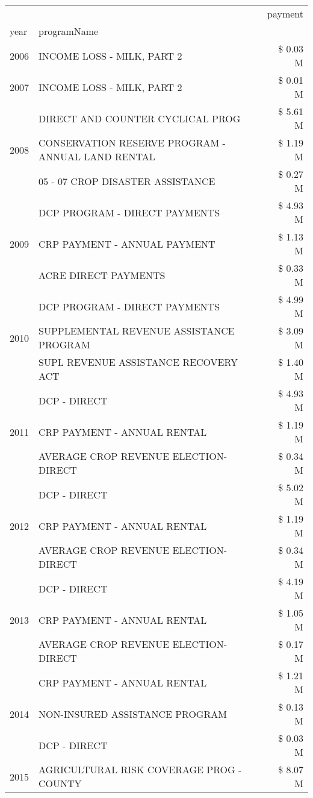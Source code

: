 \begin{tabular}{llr}
\toprule
 &  & payment \\
year & programName &  \\
\midrule
2006 & INCOME LOSS - MILK, PART 2 & \$ 0.03 M \\
\cline{1-3}
2007 & INCOME LOSS - MILK, PART 2 & \$ 0.01 M \\
\cline{1-3}
\multirow[t]{3}{*}{2008} & DIRECT AND COUNTER CYCLICAL PROG & \$ 5.61 M \\
 & CONSERVATION RESERVE PROGRAM - ANNUAL LAND RENTAL & \$ 1.19 M \\
 & 05 - 07 CROP DISASTER ASSISTANCE & \$ 0.27 M \\
\cline{1-3}
\multirow[t]{3}{*}{2009} & DCP PROGRAM - DIRECT PAYMENTS & \$ 4.93 M \\
 & CRP PAYMENT - ANNUAL PAYMENT & \$ 1.13 M \\
 & ACRE DIRECT PAYMENTS & \$ 0.33 M \\
\cline{1-3}
\multirow[t]{3}{*}{2010} & DCP PROGRAM - DIRECT PAYMENTS & \$ 4.99 M \\
 & SUPPLEMENTAL REVENUE ASSISTANCE PROGRAM & \$ 3.09 M \\
 & SUPL REVENUE ASSISTANCE RECOVERY ACT & \$ 1.40 M \\
\cline{1-3}
\multirow[t]{3}{*}{2011} & DCP - DIRECT & \$ 4.93 M \\
 & CRP PAYMENT - ANNUAL RENTAL & \$ 1.19 M \\
 & AVERAGE CROP REVENUE ELECTION-DIRECT & \$ 0.34 M \\
\cline{1-3}
\multirow[t]{3}{*}{2012} & DCP - DIRECT & \$ 5.02 M \\
 & CRP PAYMENT - ANNUAL RENTAL & \$ 1.19 M \\
 & AVERAGE CROP REVENUE ELECTION-DIRECT & \$ 0.34 M \\
\cline{1-3}
\multirow[t]{3}{*}{2013} & DCP - DIRECT & \$ 4.19 M \\
 & CRP PAYMENT - ANNUAL RENTAL & \$ 1.05 M \\
 & AVERAGE CROP REVENUE ELECTION-DIRECT & \$ 0.17 M \\
\cline{1-3}
\multirow[t]{3}{*}{2014} & CRP PAYMENT - ANNUAL RENTAL & \$ 1.21 M \\
 & NON-INSURED ASSISTANCE PROGRAM & \$ 0.13 M \\
 & DCP - DIRECT & \$ 0.03 M \\
\cline{1-3}
\multirow[t]{3}{*}{2015} & AGRICULTURAL RISK COVERAGE PROG - COUNTY & \$ 8.07 M \\

\end{tabular}
